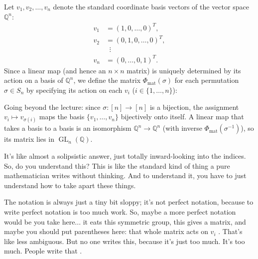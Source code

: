 \begin{content}
Let $v_1, v_2, \dots, v_n$ denote the standard coordinate basis vectors of the vector space $\mathbb{Q}^n$:
\begin{align*}
v_1 &= (1, 0, \dots, 0)^T, \\
v_2 &= (0, 1, 0, \dots, 0)^T, \\
&\;\;\vdots \\
v_n &= (0, \dots, 0, 1)^T.
\end{align*}
Since a linear map (and hence an $n \times n$ matrix) is uniquely determined by its action on a basis of $\mathbb{Q}^n$, we define the matrix $\Phi_{\text{mat}}(\sigma)$ for each permutation $\sigma \in S_n$ by specifying its action on each $v_i$ ($i \in \{1, \dots, n\}$):

\begin{steps}
Going beyond the lecture: since $\sigma \colon [n] \to [n]$ is a bijection, the assignment $v_i \mapsto v_{\sigma(i)}$ maps the basis $\{v_1, \dots, v_n\}$ bijectively onto itself. A linear map that takes a basis to a basis is an isomorphism $\mathbb{Q}^n \to \mathbb{Q}^n$ (with inverse $\Phi_{\text{mat}}(\sigma^{-1})$), so its matrix lies in $\operatorname{GL}_n(\mathbb{Q})$.
\end{steps}
\end{content}

\begin{speech}[00:09:57 - 00:10:48]
It's like almost a solipsistic answer, just totally inward-looking into the indices. So, do you understand this? This is like the standard kind of thing a pure mathematician writes without thinking. And to understand it, you have to just understand how to take apart these things.

The notation is always just a tiny bit sloppy; it's not perfect notation, because to write perfect notation is too much work. So, maybe a more perfect notation would be you take here... it eats this symmetric group, this gives a matrix, and maybe you should put parentheses here: that whole matrix acts on $v_i$ . That's like less ambiguous. But no one writes this, because it's just too much. It's too much. People write that .
\end{speech}

